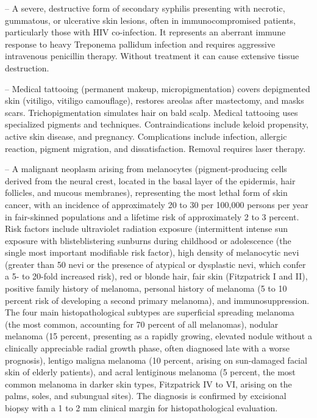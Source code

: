 -- A severe, destructive form of secondary syphilis presenting with necrotic, gummatous, or ulcerative skin lesions, often in immunocompromised patients, particularly those with HIV co-infection. It represents an aberrant immune response to heavy Treponema pallidum infection and requires aggressive intravenous penicillin therapy. Without treatment it can cause extensive tissue destruction.

-- Medical tattooing (permanent makeup, micropigmentation) covers depigmented skin (vitiligo, vitiligo camouflage), restores areolas after mastectomy, and masks scars. Trichopigmentation simulates hair on bald scalp. Medical tattooing uses specialized pigments and techniques. Contraindications include keloid propensity, active skin disease, and pregnancy. Complications include infection, allergic reaction, pigment migration, and dissatisfaction. Removal requires laser therapy.

-- A malignant neoplasm arising from melanocytes (pigment-producing cells derived from the neural crest, located in the basal layer of the epidermis, hair follicles, and mucous membranes), representing the most lethal form of skin cancer, with an incidence of approximately 20 to 30 per 100,000 persons per year in fair-skinned populations and a lifetime risk of approximately 2 to 3 percent. Risk factors include ultraviolet radiation exposure (intermittent intense sun exposure with blisteblistering sunburns during childhood or adolescence (the single most important modifiable risk factor), high density of melanocytic nevi (greater than 50 nevi or the presence of atypical or dysplastic nevi, which confer a 5- to 20-fold increased risk), red or blonde hair, fair skin (Fitzpatrick I and II), positive family history of melanoma, personal history of melanoma (5 to 10 percent risk of developing a second primary melanoma), and immunosuppression. The four main histopathological subtypes are superficial spreading melanoma (the most common, accounting for 70 percent of all melanomas), nodular melanoma (15 percent, presenting as a rapidly growing, elevated nodule without a clinically appreciable radial growth phase, often diagnosed late with a worse prognosis), lentigo maligna melanoma (10 percent, arising on sun-damaged facial skin of elderly patients), and acral lentiginous melanoma (5 percent, the most common melanoma in darker skin types, Fitzpatrick IV to VI, arising on the palms, soles, and subungual sites). The diagnosis is confirmed by excisional biopsy with a 1 to 2 mm clinical margin for histopathological evaluation.

